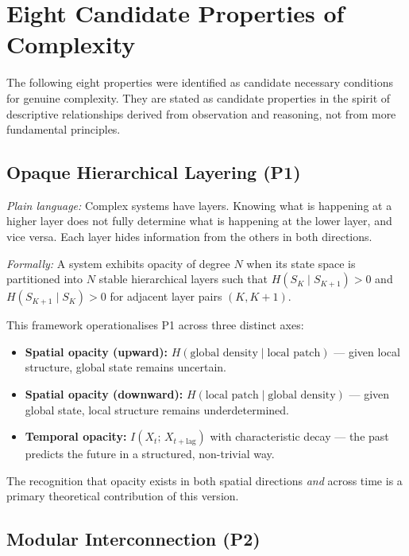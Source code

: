 \documentclass[12pt,a4paper]{article}
\begin{document}
\section{Eight Candidate Properties of Complexity}

The following eight properties were identified as candidate necessary
conditions for genuine complexity.
They are stated as candidate properties in the spirit of descriptive
relationships derived from observation and reasoning, not from more
fundamental principles.

\subsection{Opaque Hierarchical Layering (P1)}

\textit{Plain language:} Complex systems have layers.
Knowing what is happening at a higher layer does not fully determine
what is happening at the lower layer, and vice versa.
Each layer hides information from the others in both directions.

\textit{Formally:} A system exhibits opacity of degree $N$ when its
state space is partitioned into $N$ stable hierarchical layers such
that $H(S_K \mid S_{K+1}) > 0$ and $H(S_{K+1} \mid S_K) > 0$ for
adjacent layer pairs $(K, K+1)$.

This framework operationalises P1 across three distinct axes:
\begin{itemize}[noitemsep]
  \item \textbf{Spatial opacity (upward):}
    $H(\text{global density} \mid \text{local patch})$ --- given local
    structure, global state remains uncertain.
  \item \textbf{Spatial opacity (downward):}
    $H(\text{local patch} \mid \text{global density})$ --- given
    global state, local structure remains underdetermined.
  \item \textbf{Temporal opacity:}
    $I(X_t;\,X_{t+\text{lag}})$ with characteristic decay --- the past
    predicts the future in a structured, non-trivial way.
\end{itemize}

The recognition that opacity exists in both spatial directions
\emph{and} across time is a primary theoretical contribution of this
version.

\subsection{Modular Interconnection (P2)}
\end{document}

